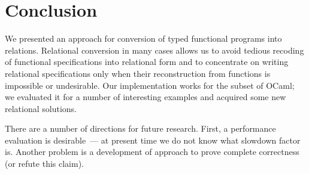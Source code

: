 \section{Conclusion}
\label{conclusion}

We presented an approach for conversion of typed functional programs into relations. Relational conversion 
in many cases allows us to avoid tedious recoding of functional specifications into relational form and to 
concentrate on writing relational specifications only when their reconstruction from functions is impossible or 
undesirable. Our implementation works for the subset of OCaml; we evaluated it for a number of interesting 
examples and acquired some new relational solutions.

There are a number of directions for future research. First, a performance evaluation is desirable~--- at
present time we do not know what slowdown factor is. Another problem is a development of approach to
prove complete correctness (or refute this claim).
